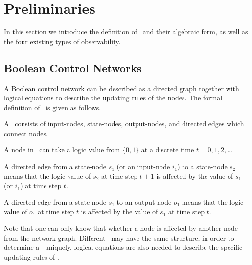 \section{Preliminaries} 
\label{sec:pre}
In this section we introduce the definition of \BCNs\ and their algebraic form, as well as the four existing types of observability.

\subsection{Boolean Control Networks}

A Boolean control network can be described as a directed graph together with logical equations to describe the updating rules of the nodes. The formal definition of \BCN\ is given as follows. 

\begin{definition} A \BCN\ consists of input-nodes, state-nodes, output-nodes, and directed edges which connect nodes. 
	
	A node in \BCN\ can take a logic value from $\{0,1\}$ at a discrete time $t=0, 1, 2,\ldots$ 
	
	A directed edge from a state-node $s_1$ (or an input-node $i_1$) to a state-node $s_2$ means that the logic value of $s_2$ at time step $t+1$ is affected by the value of $s_1$ (or $i_1$)  at time step $t$. 
	
	A directed edge from a state-node $s_1$ to an output-node $o_1$ means that the logic value of $o_1$ at time step $t$ is affected by the value of $s_1$  at time step $t$.  
\end{definition}


Note that one can only know that whether a node is affected by another node from the network graph. Different \BCNs\ may have the same structure, in order to determine a \BCN\ uniquely, logical equations are also needed to describe the specific updating rules of \BCNs.

